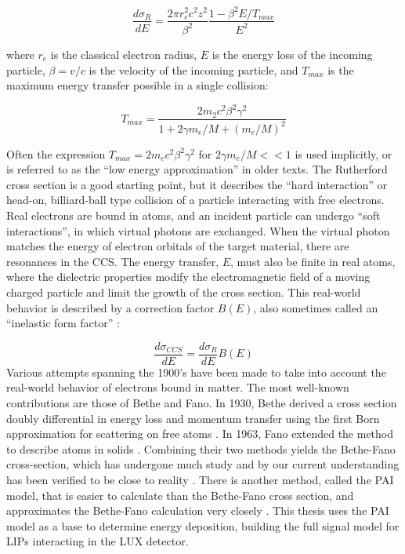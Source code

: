 \begin{equation}
\label{ruth}
\frac{d\sigma_{R}}{dE} = \frac{2\pi r_{e}^{2} c^{2} z^{2}}{\beta^{2}} \frac{1-\beta^{2} E/ T_{max}}{E^{2}}
\end{equation}

where $r_{e}$ is the classical electron radius, $E$ is the energy loss of the incoming particle, $\beta = v/c$ is the velocity of the incoming particle, and $T_{max}$ is the maximum energy transfer possible in a single collision:

\begin{equation}
\label{Tmax}
T_{max} = \frac{ 2m_{2}c^{2} \beta^{2} \gamma^{2}}{1 + 2\gamma m_{e} / M + (m_{e}/M)^{2}}
\end{equation}

Often the expression $T_{max} = 2m_{e}c^{2} \beta^{2}\gamma^{2}$ for $2\gamma m_{e} / M<< 1$ is used implicitly, or is referred to as the ``low energy approximation'' in older texts. The Rutherford cross section is a good starting point, but it describes the ``hard interaction'' or head-on, billiard-ball type collision of a particle interacting with free electrons. Real electrons are bound in atoms, and an incident particle can undergo ``soft interactions'', in which virtual photons are exchanged. When the virtual photon matches the energy of electron orbitals of the target material, there are resonances in the \ac{CCS}. The energy transfer, $E$, must also be finite in real atoms, where the dielectric properties modify the electromagnetic field of a moving charged particle and limit the growth of the cross section. This real-world behavior is described by a correction factor $B(E)$, also sometimes called an ``inelastic form factor'' \cite{PDG}:

\begin{equation}
\label{totalccs}
\frac{d\sigma_{CCS}}{dE} = \frac{d\sigma_{R}}{dE} B(E)
\end{equation}
Various attempts spanning the 1900's have been made to take into account the real-world behavior of electrons bound in matter. The most well-known contributions are those of Bethe and Fano. In 1930, Bethe derived a cross section doubly differential in energy loss and momentum transfer using the first Born approximation for scattering on free atoms \cite{Bethe:1930}. In 1963, Fano extended the method to describe atoms in solids \cite{Fano:1963}. Combining their two methods yields the Bethe-Fano cross-section, which has undergone much study and by our current understanding has been verified to be close to reality \cite{Bichsel:2006}. There is another method, called the \ac{PAI} model, that is easier to calculate than the Bethe-Fano cross section, and approximates the Bethe-Fano calculation very closely \cite{Bichsel:2006}. This thesis uses the \ac{PAI} model as a base to determine energy deposition, building the full signal model for \ac{LIP}s interacting in the \ac{LUX} detector. 

